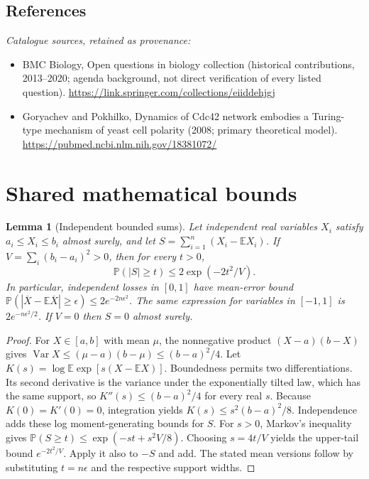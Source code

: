 \documentclass[11pt]{article}
\newcommand{\E}{\mathbb E}
\newcommand{\Prob}{\mathbb P}
\DeclareMathOperator{\Var}{Var}
\providecommand{\E}{\mathbb E}
\providecommand{\Prob}{\mathbb P}
\providecommand{\Var}{\operatorname{Var}}
\newtheorem{sharedlemma}{Lemma}[section]
\begin{document}
\subsection{References}
\noindent\emph{Catalogue sources, retained as provenance:}
\begin{itemize}
\item BMC Biology, Open questions in biology collection (historical contributions, 2013--2020; agenda background, not direct verification of every listed question). \url{https://link.springer.com/collections/eiiddehjgj}
\item Goryachev and Pokhilko, Dynamics of Cdc42 network embodies a Turing-type mechanism of yeast cell polarity (2008; primary theoretical model). \url{https://pubmed.ncbi.nlm.nih.gov/18381072/}
\end{itemize}
\clearpage


\appendix
\section{Shared mathematical bounds}\label{app:bounds}
\begin{sharedlemma}[Independent bounded sums]\label{lem:bounded}
Let independent real variables $X_i$ satisfy $a_i\leq X_i\leq b_i$ almost surely,
and let $S=\sum_{i=1}^n(X_i-\E X_i)$. If
$V=\sum_i(b_i-a_i)^2>0$, then for every $t>0$,
\[
 \Prob(|S|\geq t)\leq 2\exp(-2t^2/V).
\]
In particular, independent losses in $[0,1]$ have mean-error bound
$\Prob(|\overline X-\E\overline X|\geq\epsilon)
\leq2e^{-2n\epsilon^2}$. The same expression for variables in $[-1,1]$
is $2e^{-n\epsilon^2/2}$. If $V=0$ then $S=0$ almost surely.
\end{sharedlemma}
\begin{proof}
For $X\in[a,b]$ with mean $\mu$, the nonnegative product
$(X-a)(b-X)$ gives
$\Var X\leq(\mu-a)(b-\mu)\leq(b-a)^2/4$.
Let $K(s)=\log\E\exp[s(X-\E X)]$.
Boundedness permits two differentiations. Its second derivative is the variance
under the exponentially tilted law, which has the same support, so
$K''(s)\leq(b-a)^2/4$ for every real $s$.
Because $K(0)=K'(0)=0$, integration yields
$K(s)\leq s^2(b-a)^2/8$.
Independence adds these log moment-generating bounds for $S$.
For $s>0$, Markov's inequality gives
$\Prob(S\geq t)\leq\exp(-st+s^2V/8)$.
Choosing $s=4t/V$ yields the upper-tail bound $e^{-2t^2/V}$.
Apply it also to $-S$ and add. The stated mean versions follow by substituting
$t=n\epsilon$ and the respective support widths.
\end{proof}
\end{document}
